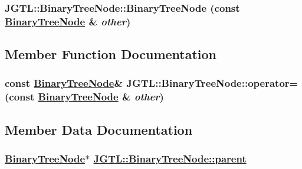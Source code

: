 \hypertarget{class_j_g_t_l_1_1_binary_tree_node_c8f227b1540adbb5b58d6e2976934cf4}{
\subsubsection[BinaryTreeNode]{\setlength{\rightskip}{0pt plus 5cm}JGTL::Binary\-Tree\-Node::Binary\-Tree\-Node (const \hyperlink{class_j_g_t_l_1_1_binary_tree_node}{Binary\-Tree\-Node} \& {\em other})}}
\label{class_j_g_t_l_1_1_binary_tree_node_c8f227b1540adbb5b58d6e2976934cf4}




\subsection{Member Function Documentation}
\hypertarget{class_j_g_t_l_1_1_binary_tree_node_c4f05932006b0bb0c1ace9e449debc5b}{
\subsubsection[operator=]{\setlength{\rightskip}{0pt plus 5cm}const \hyperlink{class_j_g_t_l_1_1_binary_tree_node}{Binary\-Tree\-Node}\& JGTL::Binary\-Tree\-Node::operator= (const \hyperlink{class_j_g_t_l_1_1_binary_tree_node}{Binary\-Tree\-Node} \& {\em other})}}
\label{class_j_g_t_l_1_1_binary_tree_node_c4f05932006b0bb0c1ace9e449debc5b}




\subsection{Member Data Documentation}
\hypertarget{class_j_g_t_l_1_1_binary_tree_node_d64ddf204d8ed7fc7d8a39da1fa72312}{
\subsubsection[parent]{\setlength{\rightskip}{0pt plus 5cm}\hyperlink{class_j_g_t_l_1_1_binary_tree_node}{Binary\-Tree\-Node}$\ast$ \hyperlink{class_j_g_t_l_1_1_binary_tree_node_d64ddf204d8ed7fc7d8a39da1fa72312}{JGTL::Binary\-Tree\-Node::parent}}}
\label{class_j_g_t_l_1_1_binary_tree_node_d64ddf204d8ed7fc7d8a39da1fa72312}


